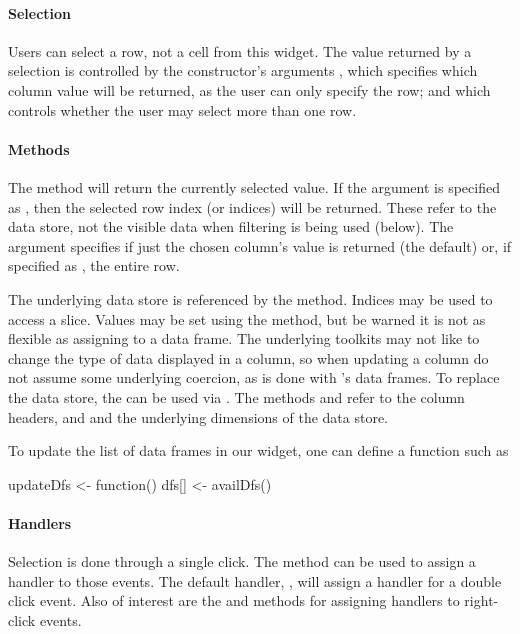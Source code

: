 \paragraph{Selection}
Users can select a row, not a cell from this widget. The value returned by a selection is
controlled by the constructor's arguments , which
specifies which column value will be returned, as the user can only
specify the row; and  which controls
whether the user may select more than one row.  


\paragraph{Methods}
The  method will return the currently selected
value. If the argument  is specified as , then
the selected row index (or indices) will be returned. These refer to
the data store, not the visible data when filtering is being used (below). The
argument  specifies if just the chosen column's value is
returned (the default) or, if specified as , the entire row.
 
The underlying data store is referenced by the \method{[}{gtable}
method. Indices may be used to access a slice. Values may be
set using the \method{[\ASSIGN}{gtable} method, but be warned it is
not as flexible as assigning to a data frame. The underlying
toolkits may not like to change the type of data displayed in a
column, so when updating a column do not assume some underlying
coercion, as is done with \R's data frames. To replace the data store, the \code{[\ASSIGN} can
be used via . The methods
 and  refer to the
column headers, and  and 
the underlying dimensions of the data store.

To update the list of data frames in our  widget, one can define a function such as
\begin{Schunk}
\begin{Sinput}
 updateDfs <- function() {
   dfs[] <- availDfs()
 }
\end{Sinput}
\end{Schunk}


\paragraph{Handlers}
Selection is done through a single click. The 
method can be used to assign a handler to those events. The default
handler, , will assign a
handler for a double click event. Also of interest are the
 and
 methods for assigning handlers
to right-click events.


